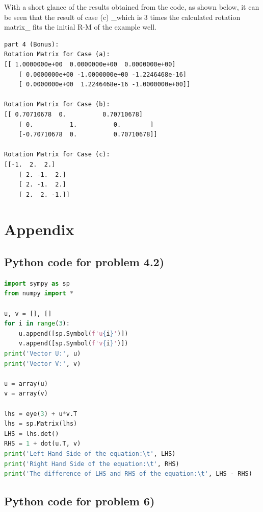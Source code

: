 \documentclass[conference]{IEEEtran}
\begin{document}
With a short glance of the results obtained from the code, as shown below, it can be seen that the result of case (c) \_which is 3 times the calculated rotation matrix\_ fits the initial R-M of the example well.

\scriptsize
\begin{verbatim}
part 4 (Bonus):
Rotation Matrix for Case (a):
[[ 1.0000000e+00  0.0000000e+00  0.0000000e+00]
    [ 0.0000000e+00 -1.0000000e+00 -1.2246468e-16]
    [ 0.0000000e+00  1.2246468e-16 -1.0000000e+00]]

Rotation Matrix for Case (b):
[[ 0.70710678  0.          0.70710678]
    [ 0.          1.          0.        ]
    [-0.70710678  0.          0.70710678]]

Rotation Matrix for Case (c):
[[-1.  2.  2.]
    [ 2. -1.  2.]
    [ 2. -1.  2.]
    [ 2.  2. -1.]]
\end{verbatim}




\section{Appendix}
\subsection{Python code for problem 4.2)}

\begin{lstlisting}[language=Python]
import sympy as sp
from numpy import *

u, v = [], []
for i in range(3):
    u.append([sp.Symbol(f'u{i}')])
    v.append([sp.Symbol(f'v{i}')])
print('Vector U:', u)
print('Vector V:', v)

u = array(u)
v = array(v)

lhs = eye(3) + u*v.T
lhs = sp.Matrix(lhs)
LHS = lhs.det()
RHS = 1 + dot(u.T, v)
print('Left Hand Side of the equation:\t', LHS)
print('Right Hand Side of the equation:\t', RHS)
print('The difference of LHS and RHS of the equation:\t', LHS - RHS)
\end{lstlisting}

\subsection{Python code for problem 6)}
\end{document}

